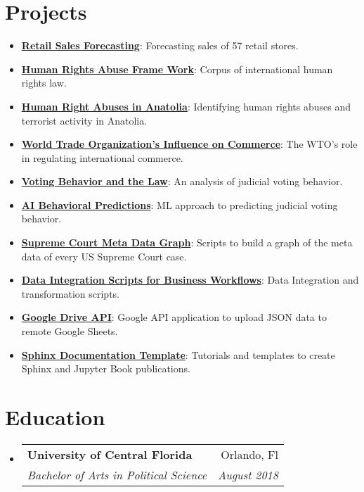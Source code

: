 \documentclass[letterpaper,11pt]{article}
\makeatletter
\newcommand{\resumeItem}[2]{
  \item\small{
    \textbf{#1}{: #2 \vspace{-2pt}}
  }
}
\newcommand{\resumeSubheading}[4]{
  \vspace{-1pt}\item
    \begin{tabular*}{0.97\textwidth}[t]{l@{\extracolsep{\fill}}r}
      \textbf{#1} & #2 \\
      \textit{\small#3} & \textit{\small #4} \\
    \end{tabular*}\vspace{-5pt}
}
\newcommand{\resumeSubItem}[2]{\resumeItem{#1}{#2}\vspace{-4pt}}
\newcommand{\resumeSubHeadingListStart}{\begin{itemize}[leftmargin=*]}
\newcommand{\resumeSubHeadingListEnd}{\end{itemize}}
\makeatother
\begin{document}
\section{Projects}
  \resumeSubHeadingListStart
    \resumeSubItem{\href{http://docs.jnapolitano.io/parts/analysis/business-analysis/project-retail-sales-forecasting/code-base/SalesForcasting.html}{Retail Sales Forecasting}}
      {Forecasting sales of 57 retail stores.}
    \resumeSubItem{\href{https://docs.jnapolitano.io/parts/analysis/political-analysis/human-rights-law/index.html}{Human Rights Abuse Frame Work}}
      {Corpus of international human rights law.}
    \resumeSubItem{\href{https://journal.jnapolitano.io/parts/articles/project-kurdish-conflict/index.html}{Human Right Abuses in Anatolia}}
      {Identifying human rights abuses and terrorist activity in Anatolia.}
    \resumeSubItem{\href{https://journal.jnapolitano.io/parts/articles/project-evolution-of-ngos/index.html}{World Trade Organization's Influence on Commerce}}
      {The WTO's role in regulating international commerce.}
    \resumeSubItem{\href{https://journal.jnapolitano.io/parts/articles/project-supcourt-masterpiececake/index.html}{Voting Behavior and the Law}}
      {An analysis of judicial voting behavior.}
    \resumeSubItem{\href{http://docs.jnapolitano.io/parts/analysis/political-analysis/sup-court/project-supcourt-tensorflow/index.html}{AI Behavioral Predictions}}
      {ML approach to predicting judicial voting behavior.}
    \resumeSubItem{\href{http://docs.jnapolitano.io/parts/analysis/political-analysis/sup-court/project-sup-court-meta-data-graph/index.html}{Supreme Court Meta Data Graph}}
      {Scripts to build a graph of the meta data of every US Supreme Court case.}
    \resumeSubItem{\href{https://docs.jnapolitano.io/parts/data/data-integration/index.html}{Data Integration Scripts for Business Workflows}}
      {Data Integration and transformation scripts.}
    \resumeSubItem{\href{https://docs.jnapolitano.io/parts/python-development/google/index.html}{Google Drive API}}
      {Google API application to upload JSON data to remote Google Sheets.}
    \resumeSubItem{\href{https://journal.jnapolitano.io/parts/tutorials/sphinx/docs/build-this-site.html}{Sphinx Documentation Template}}
      {Tutorials and templates to create Sphinx and Jupyter Book publications.}
  \resumeSubHeadingListEnd

\section{Education}
\resumeSubHeadingListStart
  \resumeSubheading
    {University of Central Florida}{Orlando, Fl}
    {Bachelor of Arts in Political Science}{August 2018}
\resumeSubHeadingListEnd
\end{document}

